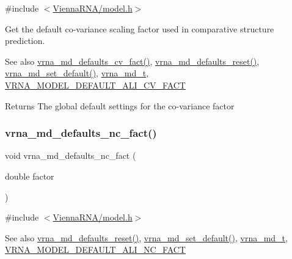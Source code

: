 {\ttfamily \#include $<$\mbox{\hyperlink{model_8h}{Vienna\+R\+N\+A/model.\+h}}$>$}



Get the default co-\/variance scaling factor used in comparative structure prediction. 

\begin{DoxySeeAlso}{See also}
\mbox{\hyperlink{group__model__details_gad3a3f40baafd91a6ce80a91a68e20053}{vrna\+\_\+md\+\_\+defaults\+\_\+cv\+\_\+fact()}}, \mbox{\hyperlink{group__model__details_ga70834424cf804d149937de89f80ceb45}{vrna\+\_\+md\+\_\+defaults\+\_\+reset()}}, \mbox{\hyperlink{group__model__details_ga8ac6ff84936282436f822644bf841f66}{vrna\+\_\+md\+\_\+set\+\_\+default()}}, \mbox{\hyperlink{group__model__details_ga1f8a10e12a0a1915f2a4eff0b28ea17c}{vrna\+\_\+md\+\_\+t}}, \mbox{\hyperlink{group__model__details_gaaaf3d73d6abc18d3889676952bfedb96}{V\+R\+N\+A\+\_\+\+M\+O\+D\+E\+L\+\_\+\+D\+E\+F\+A\+U\+L\+T\+\_\+\+A\+L\+I\+\_\+\+C\+V\+\_\+\+F\+A\+CT}} 
\end{DoxySeeAlso}
\begin{DoxyReturn}{Returns}
The global default settings for the co-\/variance factor 
\end{DoxyReturn}
\mbox{\label{group__model__details_gac35e596c850dce3ad55c49119fd7d471}} 
\subsubsection{\texorpdfstring{vrna\_md\_defaults\_nc\_fact()}{vrna\_md\_defaults\_nc\_fact()}}
{\footnotesize\ttfamily void vrna\+\_\+md\+\_\+defaults\+\_\+nc\+\_\+fact (\begin{DoxyParamCaption}\item[{double}]{factor }\end{DoxyParamCaption})}



{\ttfamily \#include $<$\mbox{\hyperlink{model_8h}{Vienna\+R\+N\+A/model.\+h}}$>$}

\begin{DoxySeeAlso}{See also}
\mbox{\hyperlink{group__model__details_ga70834424cf804d149937de89f80ceb45}{vrna\+\_\+md\+\_\+defaults\+\_\+reset()}}, \mbox{\hyperlink{group__model__details_ga8ac6ff84936282436f822644bf841f66}{vrna\+\_\+md\+\_\+set\+\_\+default()}}, \mbox{\hyperlink{group__model__details_ga1f8a10e12a0a1915f2a4eff0b28ea17c}{vrna\+\_\+md\+\_\+t}}, \mbox{\hyperlink{group__model__details_ga8f774daaafec28160c1ca5d09f2cbdba}{V\+R\+N\+A\+\_\+\+M\+O\+D\+E\+L\+\_\+\+D\+E\+F\+A\+U\+L\+T\+\_\+\+A\+L\+I\+\_\+\+N\+C\+\_\+\+F\+A\+CT}} 
\end{DoxySeeAlso}

